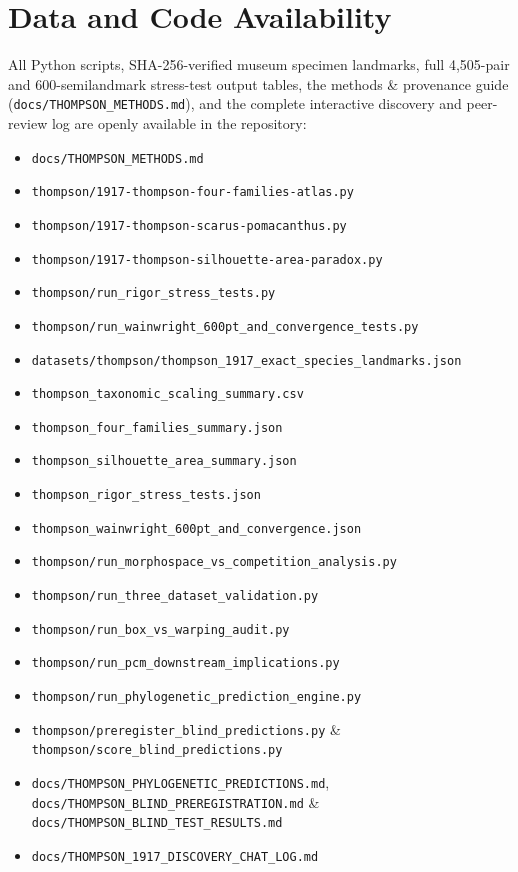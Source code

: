 \documentclass[11pt,a4paper]{article}
\theoremstyle{definition}
\theoremstyle{remark}
\begin{document}
\section*{Data and Code Availability}
All Python scripts, SHA-256-verified museum specimen landmarks, full 4,505-pair and 600-semilandmark stress-test output tables, the methods \& provenance guide (\texttt{docs/THOMPSON\_METHODS.md}), and the complete interactive discovery and peer-review log are openly available in the repository:
\begin{itemize}
  \item \texttt{docs/THOMPSON\_METHODS.md}
  \item \texttt{thompson/1917-thompson-four-families-atlas.py}
  \item \texttt{thompson/1917-thompson-scarus-pomacanthus.py}
  \item \texttt{thompson/1917-thompson-silhouette-area-paradox.py}
  \item \texttt{thompson/run\_rigor\_stress\_tests.py}
  \item \texttt{thompson/run\_wainwright\_600pt\_and\_convergence\_tests.py}
  \item \texttt{datasets/thompson/thompson\_1917\_exact\_species\_landmarks.json}
  \item \texttt{thompson\_taxonomic\_scaling\_summary.csv}
  \item \texttt{thompson\_four\_families\_summary.json}
  \item \texttt{thompson\_silhouette\_area\_summary.json}
  \item \texttt{thompson\_rigor\_stress\_tests.json}
  \item \texttt{thompson\_wainwright\_600pt\_and\_convergence.json}
  \item \texttt{thompson/run\_morphospace\_vs\_competition\_analysis.py}
  \item \texttt{thompson/run\_three\_dataset\_validation.py}
  \item \texttt{thompson/run\_box\_vs\_warping\_audit.py}
  \item \texttt{thompson/run\_pcm\_downstream\_implications.py}
  \item \texttt{thompson/run\_phylogenetic\_prediction\_engine.py}
  \item \texttt{thompson/preregister\_blind\_predictions.py} \& \texttt{thompson/score\_blind\_predictions.py}
  \item \texttt{docs/THOMPSON\_PHYLOGENETIC\_PREDICTIONS.md}, \texttt{docs/THOMPSON\_BLIND\_PREREGISTRATION.md} \& \texttt{docs/THOMPSON\_BLIND\_TEST\_RESULTS.md}
  \item \texttt{docs/THOMPSON\_1917\_DISCOVERY\_CHAT\_LOG.md}
\end{itemize}
\end{document}
